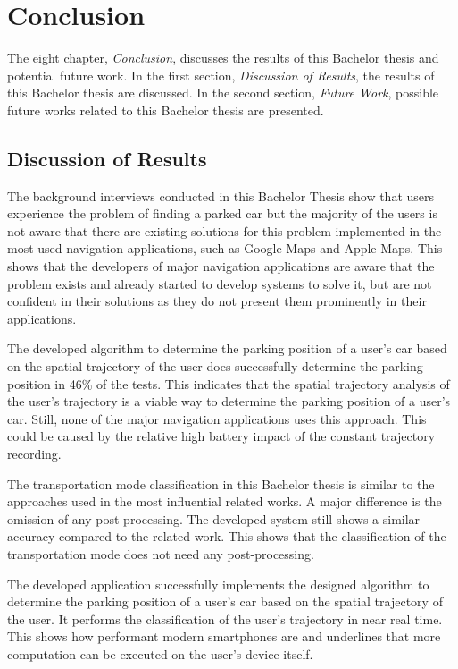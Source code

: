 \chapter{Conclusion}
The eight chapter, \textit{Conclusion}, discusses the results of this Bachelor thesis and potential future work. In the first section, \textit{Discussion of Results}, the results of this Bachelor thesis are discussed. In the second section, \textit{Future Work}, possible future works related to this Bachelor thesis are presented. 

\section{Discussion of Results}


The background interviews conducted in this Bachelor Thesis show that users experience the problem of finding a parked car but the majority of the users is not aware that there are existing solutions for this problem implemented in the most used navigation applications, such as Google Maps and Apple Maps. This shows that the developers of major navigation applications are aware that the problem exists and already started to develop systems to solve it, but are not confident in their solutions as they do not present them prominently in their applications.

The developed algorithm to determine the parking position of a user's car based on the spatial trajectory of the user does successfully determine the parking position in 46\% of the tests. This indicates that the spatial trajectory analysis of the user's trajectory is a viable way to determine the parking position of a user's car. Still, none of the major navigation applications uses this approach. This could be caused by the relative high battery impact of the constant trajectory recording. 

The transportation mode classification in this Bachelor thesis is similar to the approaches used in the most influential related works. A major difference is the omission of any post-processing. The developed system still shows a similar accuracy compared to the related work. This shows that the classification of the transportation mode does not need any post-processing. 

The developed application successfully implements the designed algorithm to determine the parking position of a user's car based on the spatial trajectory of the user. It performs the classification of the user's trajectory in near real time. This shows how performant modern smartphones are and underlines that more computation can be executed on the user's device itself. 


